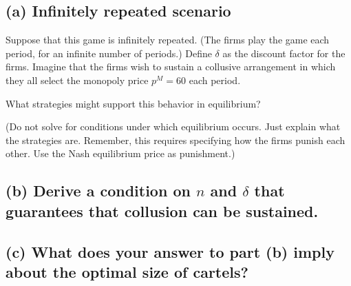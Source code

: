 \documentclass{article}
\begin{document}
\subsection*{(a) Infinitely repeated scenario}

Suppose that this game is infinitely repeated. (The firms play the
game each period, for an infinite number of periods.) Define $\delta$  as the
discount factor for the firms. Imagine that the firms wish to sustain
a collusive arrangement in which they all select the monopoly price
$p^M = 60$ each period. 

What strategies might support this behavior in
equilibrium? 

(Do not solve for conditions under which equilibrium
occurs. Just explain what the strategies are. Remember, this requires
specifying how the firms punish each other. Use the Nash equilibrium
price as punishment.)

\subsection*{(b) Derive a condition on $n$ and $\delta$ that guarantees that collusion can be
sustained.}

\subsection*{(c) What does your answer to part (b) imply about the optimal size of
cartels?}
\end{document}
